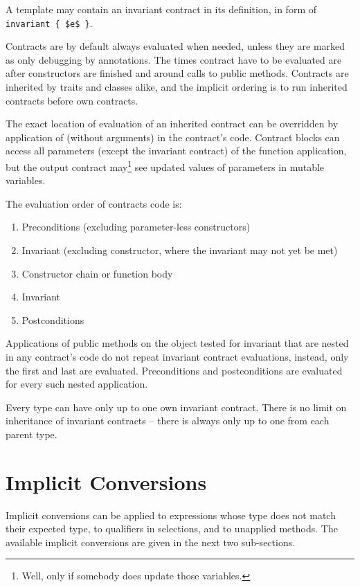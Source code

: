 A template may contain an invariant contract in its definition, in form of \lstinline!invariant { $e$ }!.

Contracts are by default always evaluated when needed, unless they are marked as only debugging by annotations. The times contract have to be evaluated are after constructors are finished and around calls to public methods. Contracts are inherited by traits and classes alike, and the implicit ordering is to run inherited contracts before own contracts. 

The exact location of evaluation of an inherited contract can be overridden by application of  (without arguments) in the contract's code. Contract blocks can access all parameters (except the invariant contract) of the function application, but the output contract may\footnote{Well, only if somebody does update those variables.} see updated values of parameters in mutable variables. 

The evaluation order of contracts code is:
\begin{enumerate}
  \item Preconditions (excluding parameter-less constructors)
  \item Invariant (excluding constructor, where the invariant may not yet be met)
  \item Constructor chain or function body
  \item Invariant
  \item Postconditions
\end{enumerate}

Applications of public methods on the object tested for invariant that are nested in any contract's code do not repeat invariant contract evaluations, instead, only the first and last are evaluated. Preconditions and postconditions are evaluated for every such nested application. 

Every type can have only up to one own invariant contract. There is no limit on inheritance of invariant contracts -- there is always only up to one from each parent type. 





\section{Implicit Conversions}
\label{sec:implicit-conversions}

Implicit conversions can be applied to expressions whose type does not match their expected type, to qualifiers in selections, and to unapplied methods. The available implicit conversions are given in the next two sub-sections.

